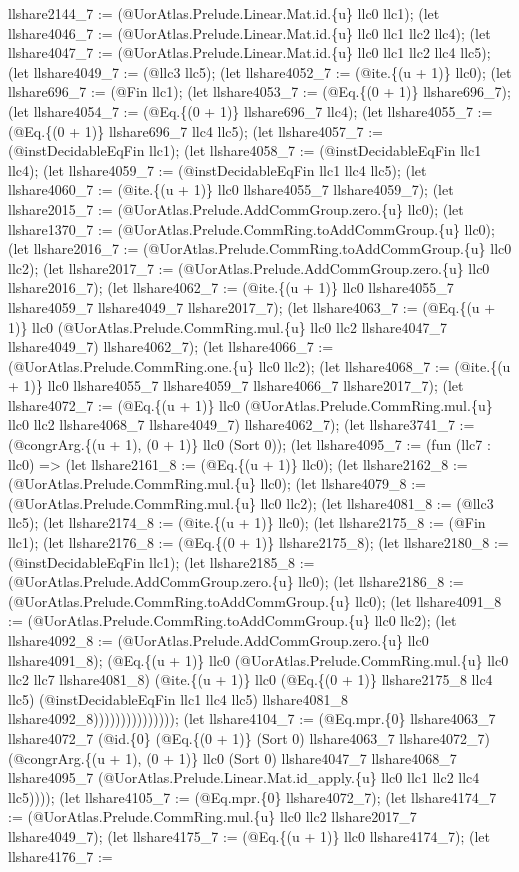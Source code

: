 \documentclass[11pt]{article}
\begin{document}
llshare2144\_7 := (@UorAtlas.Prelude.Linear.Mat.id.\{u\} llc0 llc1); (let llshare4046\_7 := (@UorAtlas.Prelude.Linear.Mat.id.\{u\} llc0 llc1 llc2 llc4); (let llshare4047\_7 := (@UorAtlas.Prelude.Linear.Mat.id.\{u\} llc0 llc1 llc2 llc4 llc5); (let llshare4049\_7 := (@llc3 llc5); (let llshare4052\_7 := (@ite.\{(u + 1)\} llc0); (let llshare696\_7 := (@Fin llc1); (let llshare4053\_7 := (@Eq.\{(0 + 1)\} llshare696\_7); (let llshare4054\_7 := (@Eq.\{(0 + 1)\} llshare696\_7 llc4); (let llshare4055\_7 := (@Eq.\{(0 + 1)\} llshare696\_7 llc4 llc5); (let llshare4057\_7 := (@instDecidableEqFin llc1); (let llshare4058\_7 := (@instDecidableEqFin llc1 llc4); (let llshare4059\_7 := (@instDecidableEqFin llc1 llc4 llc5); (let llshare4060\_7 := (@ite.\{(u + 1)\} llc0 llshare4055\_7 llshare4059\_7); (let llshare2015\_7 := (@UorAtlas.Prelude.AddCommGroup.zero.\{u\} llc0); (let llshare1370\_7 := (@UorAtlas.Prelude.CommRing.toAddCommGroup.\{u\} llc0); (let llshare2016\_7 := (@UorAtlas.Prelude.CommRing.toAddCommGroup.\{u\} llc0 llc2); (let llshare2017\_7 := (@UorAtlas.Prelude.AddCommGroup.zero.\{u\} llc0 llshare2016\_7); (let llshare4062\_7 := (@ite.\{(u + 1)\} llc0 llshare4055\_7 llshare4059\_7 llshare4049\_7 llshare2017\_7); (let llshare4063\_7 := (@Eq.\{(u + 1)\} llc0 (@UorAtlas.Prelude.CommRing.mul.\{u\} llc0 llc2 llshare4047\_7 llshare4049\_7) llshare4062\_7); (let llshare4066\_7 := (@UorAtlas.Prelude.CommRing.one.\{u\} llc0 llc2); (let llshare4068\_7 := (@ite.\{(u + 1)\} llc0 llshare4055\_7 llshare4059\_7 llshare4066\_7 llshare2017\_7); (let llshare4072\_7 := (@Eq.\{(u + 1)\} llc0 (@UorAtlas.Prelude.CommRing.mul.\{u\} llc0 llc2 llshare4068\_7 llshare4049\_7) llshare4062\_7); (let llshare3741\_7 := (@congrArg.\{(u + 1), (0 + 1)\} llc0 (Sort 0)); (let llshare4095\_7 := (fun (llc7 : llc0) => (let llshare2161\_8 := (@Eq.\{(u + 1)\} llc0); (let llshare2162\_8 := (@UorAtlas.Prelude.CommRing.mul.\{u\} llc0); (let llshare4079\_8 := (@UorAtlas.Prelude.CommRing.mul.\{u\} llc0 llc2); (let llshare4081\_8 := (@llc3 llc5); (let llshare2174\_8 := (@ite.\{(u + 1)\} llc0); (let llshare2175\_8 := (@Fin llc1); (let llshare2176\_8 := (@Eq.\{(0 + 1)\} llshare2175\_8); (let llshare2180\_8 := (@instDecidableEqFin llc1); (let llshare2185\_8 := (@UorAtlas.Prelude.AddCommGroup.zero.\{u\} llc0); (let llshare2186\_8 := (@UorAtlas.Prelude.CommRing.toAddCommGroup.\{u\} llc0); (let llshare4091\_8 := (@UorAtlas.Prelude.CommRing.toAddCommGroup.\{u\} llc0 llc2); (let llshare4092\_8 := (@UorAtlas.Prelude.AddCommGroup.zero.\{u\} llc0 llshare4091\_8); (@Eq.\{(u + 1)\} llc0 (@UorAtlas.Prelude.CommRing.mul.\{u\} llc0 llc2 llc7 llshare4081\_8) (@ite.\{(u + 1)\} llc0 (@Eq.\{(0 + 1)\} llshare2175\_8 llc4 llc5) (@instDecidableEqFin llc1 llc4 llc5) llshare4081\_8 llshare4092\_8))))))))))))))); (let llshare4104\_7 := (@Eq.mpr.\{0\} llshare4063\_7 llshare4072\_7 (@id.\{0\} (@Eq.\{(0 + 1)\} (Sort 0) llshare4063\_7 llshare4072\_7) (@congrArg.\{(u + 1), (0 + 1)\} llc0 (Sort 0) llshare4047\_7 llshare4068\_7 llshare4095\_7 (@UorAtlas.Prelude.Linear.Mat.id\_apply.\{u\} llc0 llc1 llc2 llc4 llc5)))); (let llshare4105\_7 := (@Eq.mpr.\{0\} llshare4072\_7); (let llshare4174\_7 := (@UorAtlas.Prelude.CommRing.mul.\{u\} llc0 llc2 llshare2017\_7 llshare4049\_7); (let llshare4175\_7 := (@Eq.\{(u + 1)\} llc0 llshare4174\_7); (let llshare4176\_7 := 
\end{document}
